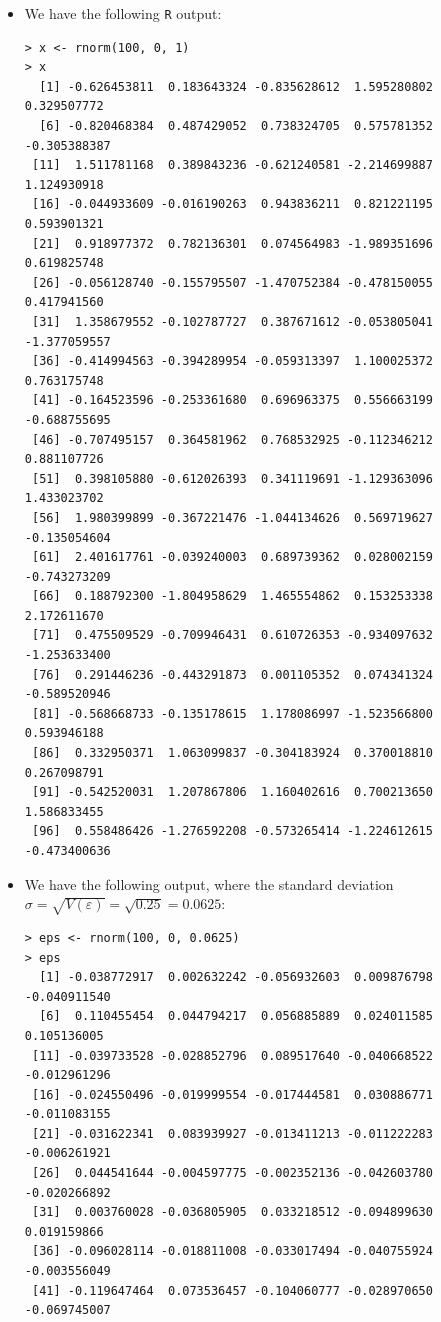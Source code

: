 \begin{itemize}
    \item[(a)] We have the following \verb|R| output:
        \begin{lstlisting}
> x <- rnorm(100, 0, 1)
> x
  [1] -0.626453811  0.183643324 -0.835628612  1.595280802  0.329507772
  [6] -0.820468384  0.487429052  0.738324705  0.575781352 -0.305388387
 [11]  1.511781168  0.389843236 -0.621240581 -2.214699887  1.124930918
 [16] -0.044933609 -0.016190263  0.943836211  0.821221195  0.593901321
 [21]  0.918977372  0.782136301  0.074564983 -1.989351696  0.619825748
 [26] -0.056128740 -0.155795507 -1.470752384 -0.478150055  0.417941560
 [31]  1.358679552 -0.102787727  0.387671612 -0.053805041 -1.377059557
 [36] -0.414994563 -0.394289954 -0.059313397  1.100025372  0.763175748
 [41] -0.164523596 -0.253361680  0.696963375  0.556663199 -0.688755695
 [46] -0.707495157  0.364581962  0.768532925 -0.112346212  0.881107726
 [51]  0.398105880 -0.612026393  0.341119691 -1.129363096  1.433023702
 [56]  1.980399899 -0.367221476 -1.044134626  0.569719627 -0.135054604
 [61]  2.401617761 -0.039240003  0.689739362  0.028002159 -0.743273209
 [66]  0.188792300 -1.804958629  1.465554862  0.153253338  2.172611670
 [71]  0.475509529 -0.709946431  0.610726353 -0.934097632 -1.253633400
 [76]  0.291446236 -0.443291873  0.001105352  0.074341324 -0.589520946
 [81] -0.568668733 -0.135178615  1.178086997 -1.523566800  0.593946188
 [86]  0.332950371  1.063099837 -0.304183924  0.370018810  0.267098791
 [91] -0.542520031  1.207867806  1.160402616  0.700213650  1.586833455
 [96]  0.558486426 -1.276592208 -0.573265414 -1.224612615 -0.473400636
        \end{lstlisting}
    \item[(b)] We have the following output, where the standard deviation
        $\sigma = \sqrt{V(\varepsilon)} = \sqrt{0.25} = 0.0625$:
        \begin{lstlisting}
> eps <- rnorm(100, 0, 0.0625)
> eps
  [1] -0.038772917  0.002632242 -0.056932603  0.009876798 -0.040911540
  [6]  0.110455454  0.044794217  0.056885889  0.024011585  0.105136005
 [11] -0.039733528 -0.028852796  0.089517640 -0.040668522 -0.012961296
 [16] -0.024550496 -0.019999554 -0.017444581  0.030886771 -0.011083155
 [21] -0.031622341  0.083939927 -0.013411213 -0.011222283 -0.006261921
 [26]  0.044541644 -0.004597775 -0.002352136 -0.042603780 -0.020266892
 [31]  0.003760028 -0.036805905  0.033218512 -0.094899630  0.019159866
 [36] -0.096028114 -0.018811008 -0.033017494 -0.040755924 -0.003556049
 [41] -0.119647464  0.073536457 -0.104060777 -0.028970650 -0.069745007

\end{lstlisting}
\end{itemize}
